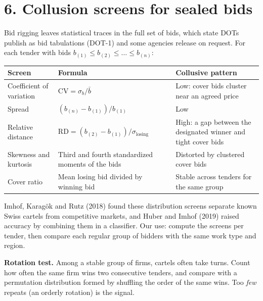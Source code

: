 \documentclass[letterpaper,11pt]{article}
\begin{document}
\hypertarget{collusion-screens-for-sealed-bids}{%
\section*{6. Collusion screens for sealed
bids}\label{collusion-screens-for-sealed-bids}}

Bid rigging leaves statistical traces in the full set of bids, which
state DOTs publish as bid tabulations (DOT-1) and some agencies release
on request. For each tender with bids
\(b_{(1)} \le b_{(2)} \le \dots \le b_{(n)}\):

\begingroup\small\setlength{\tabcolsep}{4pt}\renewcommand{\arraystretch}{1.25}
\begin{longtable}[l]{@{}>{\raggedright\arraybackslash}p{}>{\raggedright\arraybackslash}p{}>{\raggedright\arraybackslash}p{}@{}}
\rowcolor{coolblack}\leavevmode\color{white}\bfseries Screen & \leavevmode\color{white}\bfseries Formula & \leavevmode\color{white}\bfseries Collusive pattern \\
\endhead
Coefficient of variation & \(\text{CV} = \sigma_b / \bar b\) & Low: cover bids cluster near an agreed price \\
Spread & \((b_{(n)} - b_{(1)}) / b_{(1)}\) & Low \\
Relative distance & \(\text{RD} = (b_{(2)} - b_{(1)}) / \sigma_{\text{losing}}\) & High: a gap between the designated winner and tight cover bids \\
Skewness and kurtosis & Third and fourth standardized moments of the bids & Distorted by clustered cover bids \\
Cover ratio & Mean losing bid divided by winning bid & Stable across tenders for the same group \\
\end{longtable}\endgroup

Imhof, Karagök and Rutz (2018) found these distribution screens separate
known Swiss cartels from competitive markets, and Huber and Imhof (2019)
raised accuracy by combining them in a classifier. Our use: compute the
screens per tender, then compare each regular group of bidders with the
same work type and region.

\textbf{Rotation test.} Among a stable group of firms, cartels often
take turns. Count how often the same firm wins two consecutive tenders,
and compare with a permutation distribution formed by shuffling the
order of the same wins. Too \emph{few} repeats (an orderly rotation) is
the signal.
\end{document}
